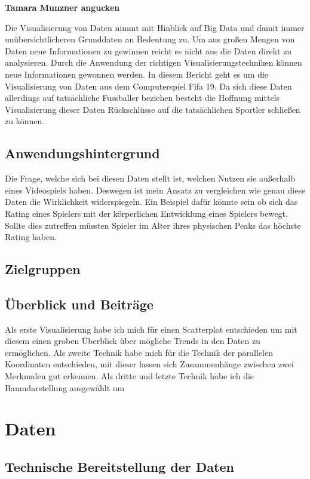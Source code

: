 \documentclass[paper=a4,12pt,titlepage,listof=totoc]{scrartcl}
\begin{document}
\textbf{Tamara Munzner angucken}

Die Visualisierung von Daten nimmt mit Hinblick auf Big Data und damit immer unübersichtlicheren Grunddaten an Bedeutung zu. Um aus großen Mengen von Daten neue Informationen zu gewinnen reicht es nicht aus die Daten direkt zu analysieren. Durch die Anwendung der richtigen Visualisierungstechniken können neue Informationen gewonnen werden. In diesem Bericht geht es um die Visualisierung von Daten aus dem Computerspiel Fifa 19. Da sich diese Daten allerdings auf tatsächliche Fussballer beziehen besteht die Hoffnung mittels Visualisierung dieser Daten Rückschlüsse auf die tatsächlichen Sportler schließen zu können.

\subsection{Anwendungshintergrund}
Die Frage, welche sich bei diesen Daten stellt ist, welchen Nutzen sie außerhalb eines Videospiels haben. Deswegen ist mein Ansatz zu vergleichen wie genau diese Daten die Wirklichkeit widerspiegeln. Ein Beispiel dafür könnte sein ob sich das Rating eines Spielers mit der körperlichen Entwicklung eines Spielers bewegt. Sollte dies zutreffen  müssten Spieler im Alter ihres physischen Peaks das höchste Rating haben.

\subsection{Zielgruppen}

\subsection{Überblick und Beiträge}
Als erste Visualisierung habe ich mich für einen Scatterplot entschieden um mit diesem einen groben Überblick über mögliche Trends in den Daten zu ermöglichen.
Als zweite Technik habe mich für die Technik der parallelen Koordinaten entschieden, mit dieser lassen sich Zusammenhänge zwischen zwei Merkmalen gut erkennen.
Als dritte und letzte Technik habe ich die Baumdarstellung ausgewählt um 
\newpage

\section{Daten}

\subsection{Technische Bereitstellung der Daten}
\end{document}
